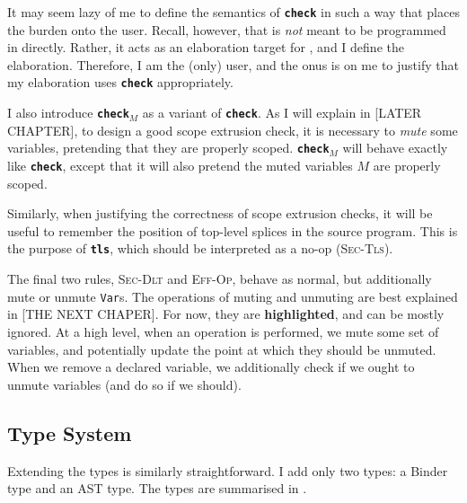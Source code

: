 It may seem lazy of me to define the semantics of \textbf{\texttt{check}} in such a way that places the burden onto the user. Recall, however, that \coreLang{} is \textit{not} meant to be programmed in directly. Rather, it acts as an elaboration target for \sourceLang{}, and I define the elaboration. Therefore, I am the (only) \coreLang{} user, and the onus is on me to justify that my elaboration uses \textbf{\texttt{check}} appropriately. 

I also introduce \textbf{\texttt{check}}$_M$ as a variant of \textbf{\texttt{check}}. As I will explain in [LATER CHAPTER], to design a good scope extrusion check, it is necessary to \textit{mute} some variables, pretending that they are properly scoped. \textbf{\texttt{check}}$_M$ will behave exactly like \textbf{\texttt{check}}, except that it will also pretend the muted variables $M$ are properly scoped.

Similarly, when justifying the correctness of scope extrusion checks, it will be useful to remember the position of top-level splices in the \sourceLang{} source program. This is the purpose of \textbf{\texttt{tls}}, which should be interpreted as a no-op (\textsc{Sec-Tls}).

The final two rules, \textsc{Sec-Dlt} and \textsc{Eff-Op}, behave as normal, but additionally mute or unmute \texttt{Var}s. The operations of muting and unmuting are best explained in [THE NEXT CHAPER]. For now, they are \textbf{\textcolor{coreHighlight}{highlighted}}, and can be mostly ignored. At a high level, when an operation is performed, we mute some set of variables, and potentially update the point at which they should be unmuted. When we remove a declared variable, we additionally check if we ought to unmute variables (and do so if we should).

\subsection{Type System}
Extending the types is similarly straightforward. I add only two types: a \textsf{Binder} type and an \textsf{AST} type. The types are summarised in .

